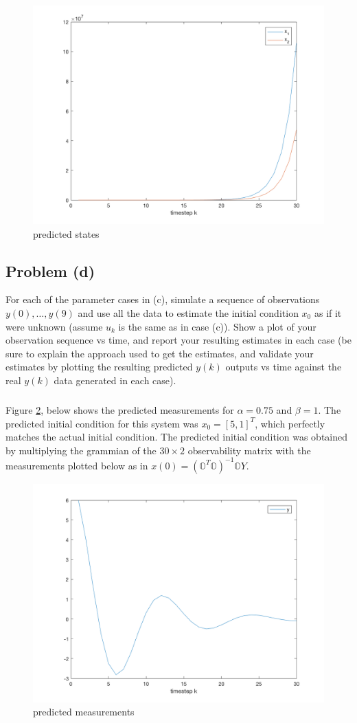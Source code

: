 \documentclass[11pt]{article}
\begin{document}
\begin{figure}[h!]
	\centering
	\includegraphics[width=0.6\linewidth]{2c_plot3.png}
	\caption{predicted states}
	\label{fig:2c_plot3}
\end{figure}

\subsection*{Problem (d)}
For each of the parameter cases in (c), simulate a sequence of observations $y(0),\dots,y(9)$ and use all the data to estimate the initial condition $x_0$ as if it were unknown (assume $u_k$ is the same as in case (c)). Show a plot of your observation sequence vs time, and report your resulting estimates in each case (be sure to explain the approach used to get the estimates, and validate your estimates by plotting the resulting predicted $y(k)$ outputs vs time against the real $y(k)$ data generated in each case).

\subparagraph*{}
Figure \ref{fig:2d_plot1}, below shows the predicted measurements for $\alpha=0.75$ and $\beta=1$. The predicted initial condition for this system was $x_0=[5,1]^T$, which perfectly matches the actual initial condition. The predicted initial condition was obtained by multiplying the grammian of the $30\times2$ observability matrix with the measurements plotted below as in $x(0)=(\mathbb{O}^T\mathbb{O})^{-1}\mathbb{O}Y$. 

\begin{figure}[h!]
	\centering
	\includegraphics[width=0.6\linewidth]{2d_plot1.png}
	\caption{predicted measurements}
	\label{fig:2d_plot1}
\end{figure}
\end{document}

